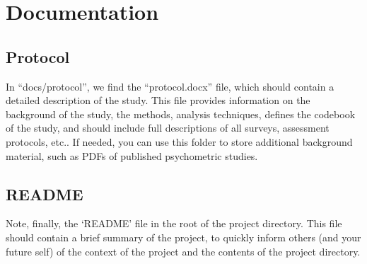 \documentclass[]{book}
\begin{document}
\section{Documentation}\label{documentation}

\subsection{Protocol}\label{protocol}

In ``docs/protocol'', we find the ``protocol.docx'' file, which should
contain a detailed description of the study. This file provides
information on the background of the study, the methods, analysis
techniques, defines the codebook of the study, and should include full
descriptions of all surveys, assessment protocols, etc.. If needed, you
can use this folder to store additional background material, such as
PDFs of published psychometric studies.

\subsection{README}\label{readme}

Note, finally, the `README' file in the root of the project directory.
This file should contain a brief summary of the project, to quickly
inform others (and your future self) of the context of the project and
the contents of the project directory.
\end{document}
